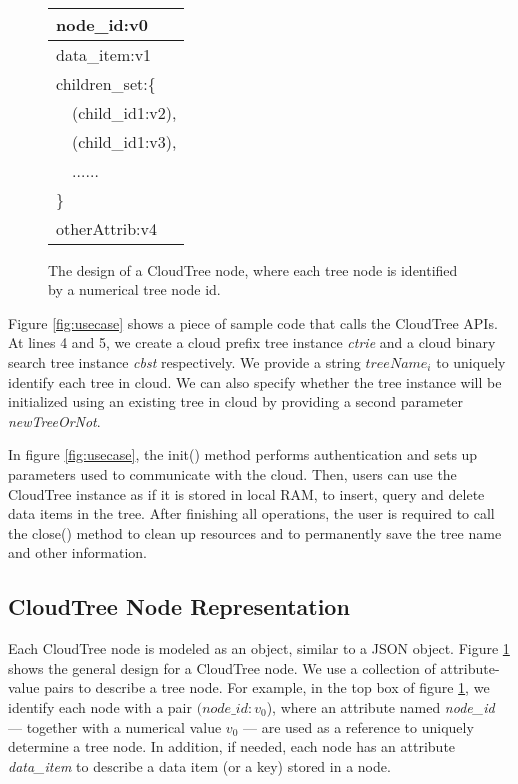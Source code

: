 \documentclass[10pt, conference, compsocconf]{IEEEtran}
\begin{document}
\begin{figure}
\begin{center}
 \begin{minipage}[c]{1.2in}
{\tt \scriptsize
\begin{tabular}{|l|}
 \hline
node\_id:v0\\
\hline
data\_item:v1\\
children\_set:\{\\
\ \ (child\_id1:v2), \\
\ \ (child\_id1:v3), \\
\ \ \;$\ldots\ldots$\\
\}\\
otherAttrib:v4\\
\hline 
\end{tabular}
}
\end{minipage}
 \begin{minipage}[c]{1.0in}
\caption{The design of a CloudTree node,  where each tree node is identified by a numerical tree node id. }
\label{fig:nodedesign}
\end{minipage}
\end{center}
\end{figure}


Figure \ref{fig:usecase} shows a piece of sample code that calls the CloudTree APIs.
At lines 4 and 5, we create a cloud prefix tree instance \emph{ctrie} and a cloud binary search tree instance \emph{cbst} respectively.
We provide a string $treeName_i$ to uniquely identify each tree in cloud. We can also specify whether the tree instance will be initialized using an existing tree in cloud by providing a second parameter \emph{newTreeOrNot}. 

In figure \ref{fig:usecase}, the init() method performs authentication and sets up parameters used to communicate with the cloud.
Then, users can use the CloudTree instance as if it is stored in local RAM, to insert, query and delete data items in the tree.
After finishing all operations, the user is required to call the close() method to clean up resources and to permanently save the tree name and other information.


\subsection{CloudTree Node Representation}
Each CloudTree node is modeled as an object, similar to a JSON object.
Figure \ref{fig:nodedesign} shows the general design for a CloudTree node.
We use a collection of attribute-value pairs to describe a tree node. For example, in the 
top box of figure \ref{fig:nodedesign},
we identify each node with a pair $(node\_id : v_0$), where an attribute named \emph{node\_id} --- 
together with a numerical value $v_0$ --- are used as a reference 
to uniquely determine a tree node.
In addition, if needed, each node has an attribute \emph{data\_item} to describe a
data item (or a key) stored in a node.
\end{document}
